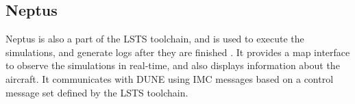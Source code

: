 \subsection{Neptus}

Neptus is also a part of the LSTS toolchain, and is used to execute the simulations, and generate logs after they are finished \cite{NEPTUS}. It provides a map interface to observe the simulations in real-time, and also displays information about the aircraft. It communicates with DUNE using IMC messages based on a control message set defined by the LSTS toolchain.